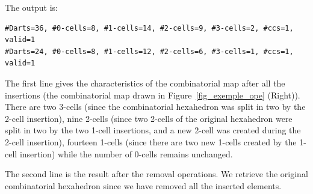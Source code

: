 
The output is:
\begin{verbatim}
#Darts=36, #0-cells=8, #1-cells=14, #2-cells=9, #3-cells=2, #ccs=1, valid=1
#Darts=24, #0-cells=8, #1-cells=12, #2-cells=6, #3-cells=1, #ccs=1, valid=1
\end{verbatim}

The first line gives the characteristics of the combinatorial map
after all the insertions (the combinatorial map drawn in
Figure~\ref{fig_exemple_ope} (Right)). There are two 3-cells (since
the combinatorial hexahedron was split in two by the 2-cell
insertion), nine 2-cells (since two 2-cells of the original hexahedron
were split in two by the two 1-cell insertions, and a new 2-cell was
created during the 2-cell insertion), fourteen 1-cells (since there
are two new 1-cells created by the 1-cell insertion) while the number
of 0-cells remains unchanged.

The second line is the result after the removal operations. We
retrieve the original combinatorial hexahedron since we have removed
all the inserted elements.

